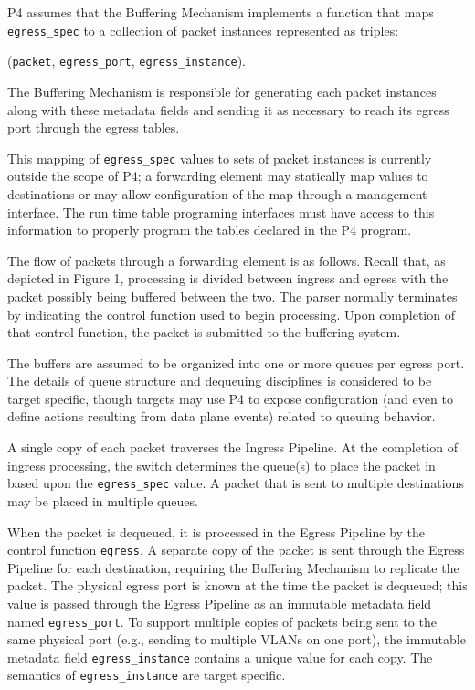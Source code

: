 \documentclass[12pt]{article}
\begin{document}
P4 assumes that the Buffering Mechanism implements a function that maps \texttt{egress_spec} to 
a collection of packet instances represented as triples:

\centerline{(\texttt{packet}, \texttt{egress_port}, \texttt{egress_instance}).}

 The Buffering Mechanism is responsible for generating 
each packet instances along with these metadata fields and sending it as necessary 
to reach its egress port through the egress \matchaction tables. 

This mapping of \texttt{egress_spec} values to sets of packet instances is currently 
outside the scope of P4; a forwarding element may statically map values to 
destinations or may allow configuration of the map through a management interface. 
The run time table programing interfaces must have access to this information 
to properly program the tables declared in the P4 program.

The flow of packets through a forwarding element is as follows. Recall that, 
as depicted in Figure 1, processing is divided between ingress and egress 
with the packet possibly being buffered between the two. The parser normally 
terminates by indicating the control function used to begin processing.  Upon 
completion of that control function, the packet is submitted to the buffering 
system.

The buffers are assumed to be organized into one or more queues per egress 
port. The details of queue structure and dequeuing disciplines is considered 
to be target specific, though targets may use P4 to expose configuration (and 
even to define actions resulting from data plane events) related to queuing 
behavior.

A single copy of each packet traverses the Ingress Pipeline. At the completion 
of ingress processing, the switch determines the queue(s) to place the packet 
in based upon the \texttt{egress_spec} value. A packet that is sent to multiple destinations 
may be placed in multiple queues.

When the packet is dequeued, it is processed in the Egress Pipeline by the 
control function \texttt{egress}. A separate copy of the packet is sent through 
the Egress Pipeline for each destination, requiring the Buffering Mechanism 
to replicate the packet. The physical egress port is known at the time the 
packet is dequeued; this value is passed through the Egress Pipeline as an 
immutable metadata field named \texttt{egress_port}. To support multiple copies 
of packets being sent to the same physical port (e.g., sending to multiple 
VLANs on one port), the immutable metadata field \texttt{egress_instance} contains 
a unique value for each copy. The semantics of \texttt{egress_instance} are target 
specific.
\end{document}

